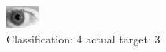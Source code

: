 \begin{figure}[h!]
\begin{center}
\includegraphics[width=0.60\columnwidth]{figures/ID188_class_4_target_3.png}
\end{center}
\caption{ Classification: 4 actual target: 3}
\label{fig:ID188_class_4_target_3}
\end{figure}
